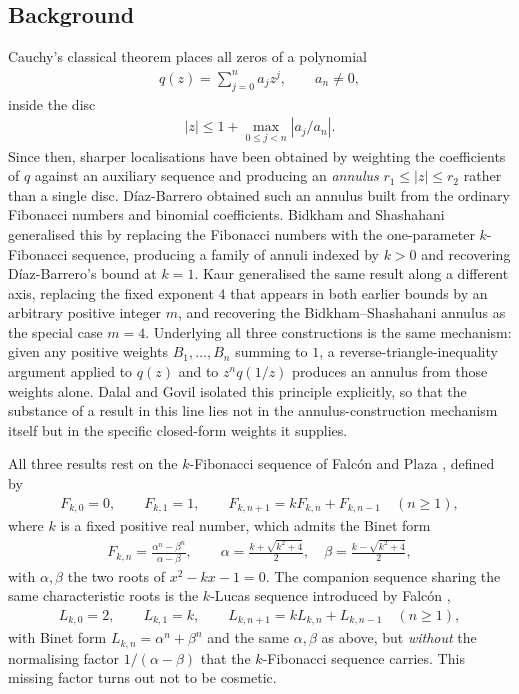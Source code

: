 \documentclass[11pt,a4paper]{article}
\numberwithin{equation}{section}
\numberwithin{table}{section}
\numberwithin{figure}{section}
\begin{document}
\subsection{Background}\label{sec:background}
Cauchy's classical theorem places all zeros of a polynomial
\begin{align*}
q(z)=\sum_{j=0}^{n}a_jz^j,\qquad a_n\neq 0,	
\end{align*}
 inside the disc 
 \begin{align*}
|z|\le 1+\max_{0\le j<n}|a_j/a_n|. 	
 \end{align*}
 Since then, sharper localisations have been obtained by weighting the coefficients of $q$ against an auxiliary sequence and producing an \emph{annulus} $r_1\le|z|\le r_2$ rather than a single disc. D\'iaz-Barrero \cite{diazbarrero} obtained such an annulus built from the ordinary Fibonacci numbers and binomial coefficients. Bidkham and Shashahani \cite{bidkham} generalised this by replacing the Fibonacci numbers with the one-parameter $k$-Fibonacci sequence, producing a family of annuli indexed by $k>0$ and recovering D\'iaz-Barrero's bound at $k=1$. Kaur \cite{kaur} generalised the same result along a different axis, replacing the fixed exponent $4$ that appears in both earlier bounds by an arbitrary positive integer $m$, and recovering the Bidkham--Shashahani annulus as the special case $m=4$. Underlying all three constructions is the same mechanism: given any positive weights $B_1,\dots,B_n$ summing to $1$, a reverse-triangle-inequality argument applied to $q(z)$ and to $z^nq(1/z)$ produces an annulus from those weights alone. Dalal and Govil \cite{dalalgovil} isolated this principle explicitly, so that the substance of a result in this line lies not in the annulus-construction mechanism itself but in the specific closed-form weights it supplies.

All three results rest on the $k$-Fibonacci sequence of Falc\'on and Plaza \cite{falconplaza}, defined by
 \begin{align*}
F_{k,0}=0,\qquad F_{k,1}=1,\qquad F_{k,n+1}=kF_{k,n}+F_{k,n-1}\quad(n\ge1),
 \end{align*}
where $k$ is a fixed positive real number, which admits the Binet form
 \begin{align*}
F_{k,n}=\frac{\alpha^n-\beta^n}{\alpha-\beta},\qquad
\alpha=\frac{k+\sqrt{k^2+4}}{2},\quad \beta=\frac{k-\sqrt{k^2+4}}{2},
 \end{align*}
with $\alpha,\beta$ the two roots of $x^2-kx-1=0$. The companion sequence sharing the same characteristic roots is the $k$-Lucas sequence introduced by Falc\'on \cite{falconlucas},
 \begin{align*}
L_{k,0}=2,\qquad L_{k,1}=k,\qquad L_{k,n+1}=kL_{k,n}+L_{k,n-1}\quad(n\ge1),
 \end{align*}
with Binet form $L_{k,n}=\alpha^n+\beta^n$ and the same $\alpha,\beta$ as above, but \emph{without} the normalising factor $1/(\alpha-\beta)$ that the $k$-Fibonacci sequence carries. This missing factor turns out not to be cosmetic. 
\end{document}
